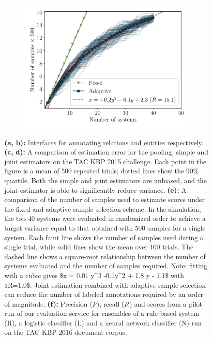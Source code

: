 \begin{figure}
  \begin{subfigure}{0.49\textwidth}
    \centering
    \includegraphics[width=\textwidth]{figures/simulation/simulation-n}
    \caption{}
  \end{subfigure}
  \hfill
  \begin{subfigure}{0.49\textwidth}
    \centering
    
    \vfill
    \caption{\label{fig:evaluation-results}}
  \end{subfigure}

  \caption{\label{fig:simulation}
  \textbf{(a, b):} Interfaces for annotating relations and entities respectively.
  \textbf{(c, d):}
  A comparison of estimation error for the pooling, simple and joint estimators on the TAC KBP 2015 challenge.
  Each point in the figure is a mean of 500 repeated trials; dotted lines show the 90\% quartile.
  Both the simple and joint estimators are unbiased, and the joint estimator is able to significantly reduce variance.
  \textbf{(e):} 
  A comparison of the number of samples used to estimate scores under the fixed and adaptive sample selection scheme.
  In the simulation, the top 40 systems were evaluated in randomized order to achieve a target variance equal to that obtained with 500 samples for a single system.
  Each faint line shows the number of samples used during a single trial, while solid lines show the mean over 100 trials.
  The dashed line shows a square-root relationship between the number of systems evaluated and the number of samples required.
  \ac{Note: fitting with a cubic gives $x = 0.01 y^3 -0.1y^2 + 1.8 y - 1.1$ with $R=1.0$.}
  Joint estimation combined with adaptive sample selection can reduce the number of labeled annotations required by an order of magnitude.
  \textbf{(f):} 
Precision ($P$), recall ($R$) and \fone{} scores from a pilot run of our evaluation service for ensembles of a rule-based system (R), a logistic classifier (L) and a neural network classifier (N) run on the TAC KBP 2016 document corpus. 
  }
\end{figure}

